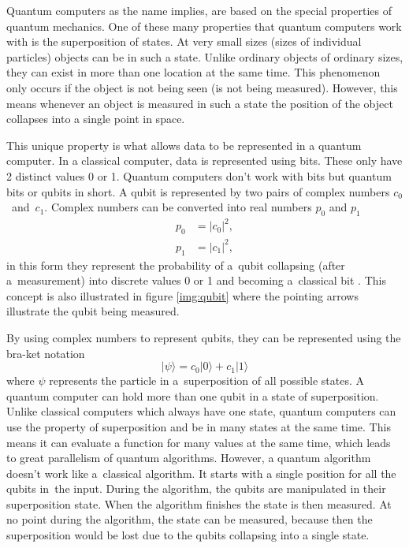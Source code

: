 Quantum computers as the name implies, are based on the special properties of quantum mechanics. One of these many properties that quantum computers work with is the superposition of states. At very small sizes (sizes of individual particles) objects can be in such a state. Unlike ordinary objects of ordinary sizes, they can exist in more than one location at the same time. This phenomenon only occurs if the object is not being seen (is not being measured). However, this means whenever an object is measured in such a state the position of the object collapses into a single point in space. \cite{Yanofsky2008}


This unique property is what allows data to be represented in a quantum computer. In a classical computer, data is represented using bits. These only have 2 distinct values 0 or 1. Quantum computers don't work with bits but quantum bits or qubits in short. A qubit is represented by two pairs of complex numbers $c_0$~and~$c_1$. Complex numbers can be converted into real numbers $p_0$ and $p_1$
\begin{equation}
  \begin{aligned}
    p_0 & = \lvert c_0 \rvert^2, \\
    p_1 & = \lvert c_1 \rvert^2,
  \end{aligned}
\end{equation}
in this form they represent the probability of a~qubit collapsing (after a~measurement) into discrete values 0 or 1 and becoming a~classical bit \cite{Yanofsky2008}. This concept is also illustrated in figure \ref{img:qubit} where the pointing arrows illustrate the qubit being measured.

By using complex numbers to represent qubits, they can be represented using the bra-ket notation
\begin{equation}
  \lvert\psi\rangle=c_0|0\rangle + c_1|1\rangle
\end{equation}
where $\psi$ represents the particle in a~superposition of all possible states. A quantum computer can hold more than one qubit in a state of superposition. Unlike classical computers which always have one state, quantum computers can use the property of superposition and be in many states at the same time. This means it can evaluate a function for many values at the same time, which leads to great parallelism of quantum algorithms. However, a quantum algorithm doesn't work like a~classical algorithm. It starts with a single position for all the qubits in~the input. During the algorithm, the qubits are manipulated in their superposition state. When the algorithm finishes the state is then measured. At no point during the algorithm, the state can be measured, because then the superposition would be lost due to the qubits collapsing into a single state. \cite{Yanofsky2008}
